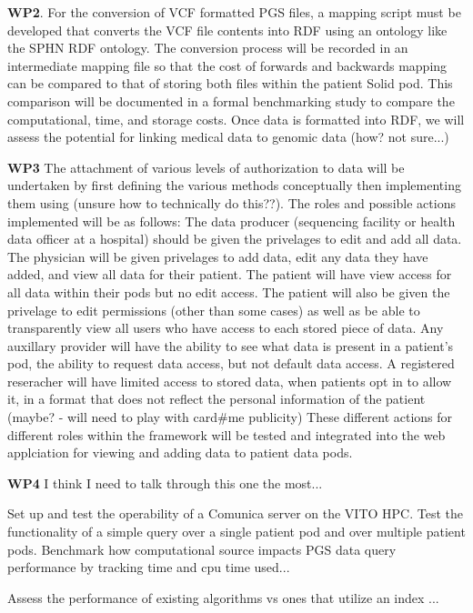 \documentclass[runningheads]{llncs}
\begin{document}
\textbf{WP2}.
For the conversion of VCF formatted PGS files, a mapping script must be developed that converts the VCF file contents into RDF using an ontology like the SPHN RDF ontology. 
The conversion process will be recorded in an intermediate mapping file so that the cost of forwards and backwards mapping can be compared to that of storing both files within the patient Solid pod. 
This comparison will be documented in a formal benchmarking study to compare the computational, time, and storage costs.
Once data is formatted into RDF, we will assess the potential for linking medical data to genomic data (how? not sure...)

\textbf{WP3}
The attachment of various levels of authorization to data will be undertaken by first defining the various methods conceptually then implementing them using (unsure how to technically do this??). 
The roles and possible actions implemented will be as follows:
The data producer (sequencing facility or health data officer at a hospital) should be given the privelages to edit and add all data. 
The physician will be given privelages to add data, edit any data they have added, and view all data for their patient.
The patient will have view access for all data within their pods but no edit access.
The patient will also be given the privelage to edit permissions (other than some cases) as well as be able to transparently view all users who have access to each stored piece of data.
Any auxillary provider will have the ability to see what data is present in a patient's pod, the ability to request data access, but not default data access.
A registered reseracher will have limited access to stored data, when patients opt in to allow it, in a format that does not reflect the personal information of the patient (maybe? - will need to play with card#me publicity)
These different actions for different roles within the framework will be tested and integrated into the web applciation for viewing and adding data to patient data pods. 

\textbf{WP4}
I think I need to talk through this one the most... 

Set up and test the operability of a Comunica server on the VITO HPC.
Test the functionality of a simple query over a single patient pod and over multiple patient pods.
Benchmark how computational source impacts PGS data query performance by tracking time and cpu time used...

Assess the performance of existing algorithms vs ones that utilize an index ...
\end{document}

